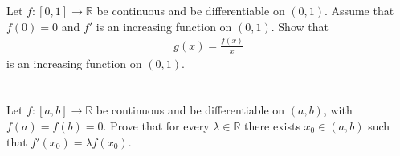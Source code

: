\documentclass[11pt,letterpaper]{article}
\begin{document}
\section{}
Let $f:[0,1]\to\mathbb{R}$ be continuous and be differentiable on $(0,1)$. Assume that $f(0) = 0$ and $f'$ is an increasing function on $(0,1)$. Show that
\begin{align}
    g(x)=\frac{f(x)}{x}
\end{align}
is an increasing function on $(0,1)$.

\section{}
Let $f:[a,b]\to\mathbb{R}$ be continuous and be differentiable on $(a,b)$, with $f(a) = f(b) = 0$. Prove that for every $\lambda\in\mathbb{R}$ there exists $x_0\in(a,b)$ such that $f'(x_0)=\lambda f(x_0)$.


\vfill
\printbibliography
\end{document}
